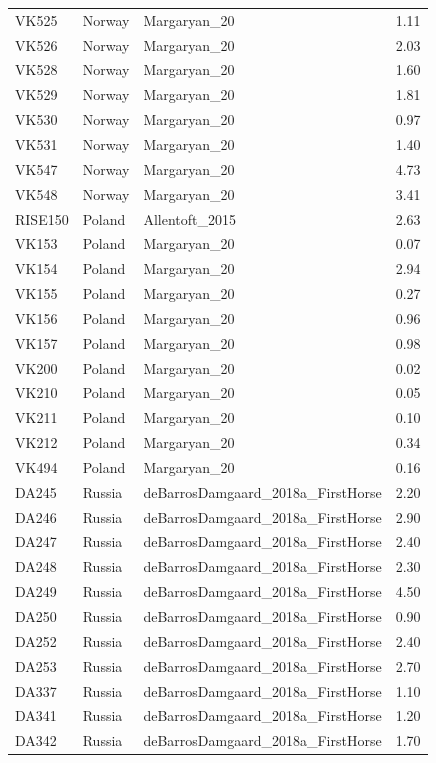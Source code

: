 \begin{longtable}[t]{lllr}
VK525 & Norway & Margaryan\_20 & 1.11\\
VK526 & Norway & Margaryan\_20 & 2.03\\
VK528 & Norway & Margaryan\_20 & 1.60\\
VK529 & Norway & Margaryan\_20 & 1.81\\
VK530 & Norway & Margaryan\_20 & 0.97\\
VK531 & Norway & Margaryan\_20 & 1.40\\
VK547 & Norway & Margaryan\_20 & 4.73\\
VK548 & Norway & Margaryan\_20 & 3.41\\
RISE150 & Poland & Allentoft\_2015 & 2.63\\
VK153 & Poland & Margaryan\_20 & 0.07\\
VK154 & Poland & Margaryan\_20 & 2.94\\
VK155 & Poland & Margaryan\_20 & 0.27\\
VK156 & Poland & Margaryan\_20 & 0.96\\
VK157 & Poland & Margaryan\_20 & 0.98\\
VK200 & Poland & Margaryan\_20 & 0.02\\
VK210 & Poland & Margaryan\_20 & 0.05\\
VK211 & Poland & Margaryan\_20 & 0.10\\
VK212 & Poland & Margaryan\_20 & 0.34\\
VK494 & Poland & Margaryan\_20 & 0.16\\
DA245 & Russia & deBarrosDamgaard\_2018a\_FirstHorse & 2.20\\
DA246 & Russia & deBarrosDamgaard\_2018a\_FirstHorse & 2.90\\
DA247 & Russia & deBarrosDamgaard\_2018a\_FirstHorse & 2.40\\
DA248 & Russia & deBarrosDamgaard\_2018a\_FirstHorse & 2.30\\
DA249 & Russia & deBarrosDamgaard\_2018a\_FirstHorse & 4.50\\
DA250 & Russia & deBarrosDamgaard\_2018a\_FirstHorse & 0.90\\
DA252 & Russia & deBarrosDamgaard\_2018a\_FirstHorse & 2.40\\
DA253 & Russia & deBarrosDamgaard\_2018a\_FirstHorse & 2.70\\
DA337 & Russia & deBarrosDamgaard\_2018a\_FirstHorse & 1.10\\
DA341 & Russia & deBarrosDamgaard\_2018a\_FirstHorse & 1.20\\
DA342 & Russia & deBarrosDamgaard\_2018a\_FirstHorse & 1.70\\

\end{longtable}
